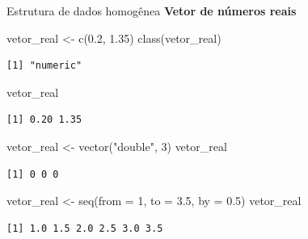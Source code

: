 \documentclass[
  10pt,
  ignorenonframetext,
]{beamer}
\newenvironment{Shaded}{\begin{snugshade}}{\end{snugshade}}
\newcommand{\AttributeTok}[1]{\textcolor[rgb]{0.40,0.45,0.13}{#1}}
\newcommand{\DecValTok}[1]{\textcolor[rgb]{0.68,0.00,0.00}{#1}}
\newcommand{\FloatTok}[1]{\textcolor[rgb]{0.68,0.00,0.00}{#1}}
\newcommand{\FunctionTok}[1]{\textcolor[rgb]{0.28,0.35,0.67}{#1}}
\newcommand{\NormalTok}[1]{\textcolor[rgb]{0.00,0.23,0.31}{#1}}
\newcommand{\OtherTok}[1]{\textcolor[rgb]{0.00,0.23,0.31}{#1}}
\newcommand{\StringTok}[1]{\textcolor[rgb]{0.13,0.47,0.30}{#1}}
\begin{document}
\begin{frame}[fragile]{Estrutura de dados homogênea}
\protect\hypertarget{estrutura-de-dados-homoguxeanea-1}{}
\textbf{Vetor de números reais}

\begin{Shaded}
\begin{Highlighting}[]
\NormalTok{vetor\_real  }\OtherTok{\textless{}{-}} \FunctionTok{c}\NormalTok{(}\FloatTok{0.2}\NormalTok{, }\FloatTok{1.35}\NormalTok{)}
\FunctionTok{class}\NormalTok{(vetor\_real)}
\end{Highlighting}
\end{Shaded}

\begin{verbatim}
[1] "numeric"
\end{verbatim}

\begin{Shaded}
\begin{Highlighting}[]
\NormalTok{vetor\_real}
\end{Highlighting}
\end{Shaded}

\begin{verbatim}
[1] 0.20 1.35
\end{verbatim}

\begin{Shaded}
\begin{Highlighting}[]
\NormalTok{vetor\_real }\OtherTok{\textless{}{-}} \FunctionTok{vector}\NormalTok{(}\StringTok{"double"}\NormalTok{, }\DecValTok{3}\NormalTok{)}
\NormalTok{vetor\_real}
\end{Highlighting}
\end{Shaded}

\begin{verbatim}
[1] 0 0 0
\end{verbatim}

\begin{Shaded}
\begin{Highlighting}[]
\NormalTok{vetor\_real }\OtherTok{\textless{}{-}} \FunctionTok{seq}\NormalTok{(}\AttributeTok{from =} \DecValTok{1}\NormalTok{, }\AttributeTok{to =} \FloatTok{3.5}\NormalTok{, }\AttributeTok{by =} \FloatTok{0.5}\NormalTok{)}
\NormalTok{vetor\_real}
\end{Highlighting}
\end{Shaded}

\begin{verbatim}
[1] 1.0 1.5 2.0 2.5 3.0 3.5
\end{verbatim}
\end{frame}
\end{document}
